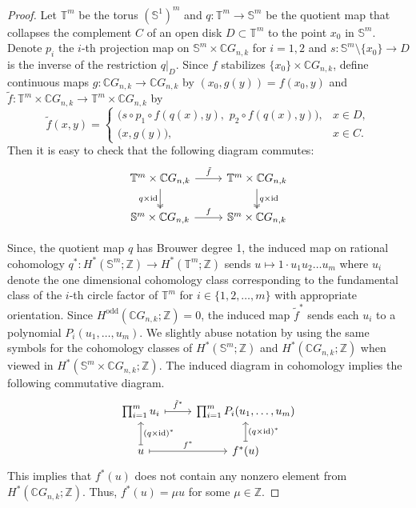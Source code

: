 \documentclass{amsart}
\begin{document}
	
	\begin{proof}
		Let $\mathbb T^m$ be the torus $(\mathbb S^1)^m$ and
		$q:\mathbb T^m\to \mathbb S^m$ be the quotient map that collapses the complement $C$ of an open disk $D\subset \mathbb T^m$ to the point $x_0$ in $\mathbb{S}^m$.  Denote $p_i$ the $i$-th projection map on $\mathbb S^m\times \mathbb CG_{n,k}$ for $i=1,2$ and $s:\mathbb S^m\setminus\{x_0\}\to D$ is the inverse of the restriction $q|_D$.
		Since $f$ stabilizes $\{x_0\}\times \mathbb{C}G_{n,k}$, define continuous maps
		$g:\mathbb{C}G_{n,k}\to \mathbb{C}G_{n,k}$ by $(x_0,g(y)) = f(x_0,y)$ and $\tilde f:\mathbb T^m\times \mathbb{C}G_{n,k}\to \mathbb T^m\times \mathbb{C}G_{n,k}$ by
		\[
		\tilde f(x,y)=
		\begin{cases}
			\big(s\circ p_1\circ f(q(x),y),\,\,p_2\circ f(q(x),y)\big), & x\in D,\\[2pt]
			\big(x,g(y)\big), & x\in C.
		\end{cases}
		\]
		Then it is easy to check that the following diagram commutes:
		\[ \begin{tikzcd}
			{\mathbb T^m\times \mathbb{C}G_{n,k}} & {\mathbb T^m\times \mathbb{C}G_{n,k}} \\
			{\mathbb S^m\times \mathbb{C}G_{n,k}} & {\mathbb S^m\times \mathbb{C}G_{n,k}}
			\arrow["{\tilde f}", from=1-1, to=1-2]
			\arrow["{q\times \mathrm{id}}"', two heads, from=1-1, to=2-1]
			\arrow["{q\times \mathrm{id}}", two heads, from=1-2, to=2-2]
			\arrow["f", from=2-1, to=2-2]
		\end{tikzcd}
		\]
		
		Since, the quotient map $q$ has Brouwer degree 1, the induced map on rational cohomology $q^*: H^*(\mathbb{S}^m; \mathbb{Z}) \rightarrow H^*(\mathbb{T}^m;\mathbb{Z})$ sends $u\mapsto 1\cdot u_1 u_2 \dots u_m$ where $u_i$ denote the one dimensional cohomology class corresponding to the fundamental class of the $i$-th circle factor of $\mathbb T^m$ for $i\in \{1,2,\ldots,m\}$ with appropriate orientation. 
		Since $H^{\mathrm{odd}}(\mathbb{C}G_{n,k};\mathbb Z)=0$, the induced map $\tilde f^*$ sends each $u_i$ to a polynomial $P_i(u_1,\dots,u_m)$.  We slightly abuse notation by using the same symbols for the cohomology classes of $H^*(\mathbb S^m;\mathbb Z)$ and $H^*(\mathbb{C}G_{n,k};\mathbb Z)$ when viewed in $H^*(\mathbb S^m\times \mathbb CG_{n,k};\mathbb Z)$.
		The induced diagram in cohomology implies the following commutative diagram.
		\[
		\begin{tikzcd}
			{\prod_{i=1}^m u_i} & {\prod_{i=1}^m P_i(u_1,\ldots,u_m)} \\
			u & {f^*(u)}
			\arrow["{\tilde f^*}", maps to, from=1-1, to=1-2]
			\arrow["{(q\times \mathrm{id})^*}"', maps to, from=2-1, to=1-1]
			\arrow["{f^*}", maps to, from=2-1, to=2-2]
			\arrow["{(q\times \mathrm{id})^*}"', maps to, from=2-2, to=1-2]
		\end{tikzcd}
		\]
		This implies that $f^*(u)$ does not contain any nonzero element from $H^*(\mathbb{C}G_{n,k};\mathbb Z)$.  
		Thus, $f^*(u)=\mu u$ for some $\mu\in \mathbb Z$.
	\end{proof}
\end{document}
